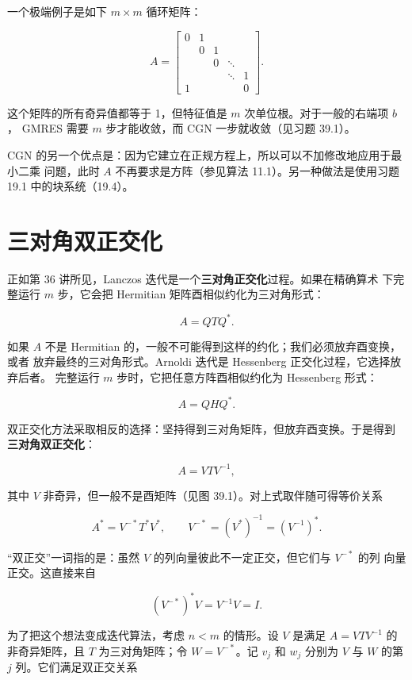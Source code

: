\documentclass[UTF8,fontset=none,12pt]{ctexart}
\begin{document}
一个极端例子是如下 $m\times m$ 循环矩阵：

\begin{equation}
A=
\begin{bmatrix}
0&1&&&\\
 &0&1&&\\
 &&0&\ddots&\\
 &&&\ddots&1\\
1&&&&0
\end{bmatrix}.
\tag{39.5}
\end{equation}

这个矩阵的所有奇异值都等于 1，但特征值是 $m$ 次单位根。对于一般的右端项 $b$，
GMRES 需要 $m$ 步才能收敛，而 CGN 一步就收敛（见习题 39.1）。

CGN 的另一个优点是：因为它建立在正规方程上，所以可以不加修改地应用于最小二乘
问题，此时 $A$ 不再要求是方阵（参见算法 11.1）。另一种做法是使用习题 19.1
中的块系统（19.4）。

\section*{三对角双正交化}

正如第 36 讲所见，Lanczos 迭代是一个\textbf{三对角正交化}过程。如果在精确算术
下完整运行 $m$ 步，它会把 Hermitian 矩阵酉相似约化为三对角形式：

\[
A=QTQ^*.
\]

如果 $A$ 不是 Hermitian 的，一般不可能得到这样的约化；我们必须放弃酉变换，或者
放弃最终的三对角形式。Arnoldi 迭代是 Hessenberg 正交化过程，它选择放弃后者。
完整运行 $m$ 步时，它把任意方阵酉相似约化为 Hessenberg 形式：

\[
A=QHQ^*.
\]

双正交化方法采取相反的选择：坚持得到三对角矩阵，但放弃酉变换。于是得到
\textbf{三对角双正交化}：

\[
A=VTV^{-1},
\]

其中 $V$ 非奇异，但一般不是酉矩阵（见图 39.1）。对上式取伴随可得等价关系

\[
A^*=V^{-*}T^*V^*,
\qquad
V^{-*}=(V^*)^{-1}=(V^{-1})^*.
\]

“双正交”一词指的是：虽然 $V$ 的列向量彼此不一定正交，但它们与 $V^{-*}$ 的列
向量正交。这直接来自

\[
(V^{-*})^*V=V^{-1}V=I.
\]

为了把这个想法变成迭代算法，考虑 $n<m$ 的情形。设 $V$ 是满足
$A=VTV^{-1}$ 的非奇异矩阵，且 $T$ 为三对角矩阵；令 $W=V^{-*}$。记 $v_j$
和 $w_j$ 分别为 $V$ 与 $W$ 的第 $j$ 列。它们满足双正交关系
\end{document}
